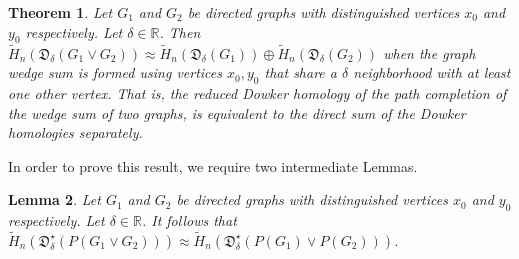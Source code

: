 \documentclass[pdflatex,bst/sn-mathphys-num]{sn-jnl}%
\newcommand{\toti}[1] {{\textcolor{pink}{{\sf Tobias: } #1}}}
\theoremstyle{thmstyleone}%
\newtheorem{theorem}{Theorem}%
\newtheorem{lem}[theorem]{Lemma}%
\theoremstyle{definition}
\theoremstyle{thmstyletwo}%
\newcommand{\FD}{\mathfrak{D}}
\theoremstyle{thmstylethree}%
\begin{document}
\begin{theorem}\label{thm:wedge_sum}
    Let $G_1$ and $G_2$ be directed graphs with distinguished vertices $x_0$ and $y_0$ respectively. Let $\delta\in\mathbb{R}$. Then $\tilde{H}_n(\FD_\delta(G_1\vee G_2))\approx \tilde{H}_n(\FD_\delta(G_1))\oplus \tilde{H}_n(\FD_\delta(G_2))$ when the graph wedge sum is formed using vertices $x_0,y_0$ that share a $\delta$ neighborhood with at least one other vertex. That is, the reduced Dowker homology of the path completion of the wedge sum of two graphs, is equivalent to the direct sum of the Dowker homologies separately.
\end{theorem}

In order to prove this result, we require two intermediate Lemmas.
\begin{lem}\label{lem:path_wedge}
    Let $G_1$ and $G_2$ be directed graphs with distinguished vertices $x_0$ and $y_0$ respectively. Let $\delta\in\mathbb{R}$. It follows that  $\tilde{H}_n(\FD^\star_\delta(P(G_1\vee G_2)))
    \approx
    \tilde{H}_n(\FD^\star_\delta(P(G_1)\vee P(G_2)))
        $.
\end{lem}
\end{document}
